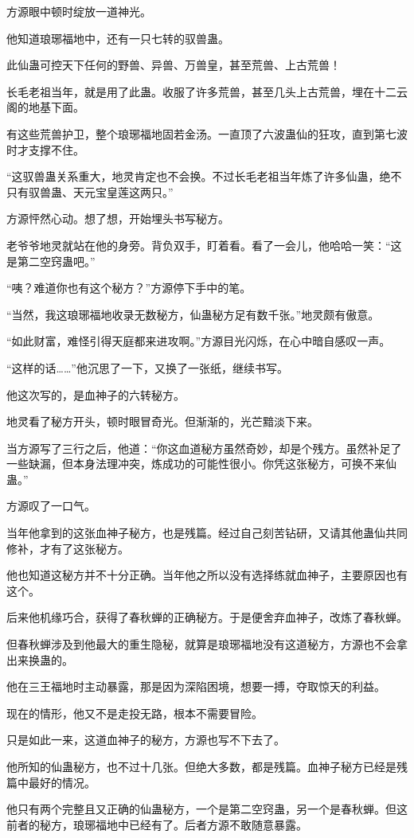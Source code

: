 \begin{this_body}
方源眼中顿时绽放一道神光。

他知道琅琊福地中，还有一只七转的驭兽蛊。

此仙蛊可控天下任何的野兽、异兽、万兽皇，甚至荒兽、上古荒兽！

长毛老祖当年，就是用了此蛊。收服了许多荒兽，甚至几头上古荒兽，埋在十二云阁的地基下面。

有这些荒兽护卫，整个琅琊福地固若金汤。一直顶了六波蛊仙的狂攻，直到第七波时才支撑不住。

“这驭兽蛊关系重大，地灵肯定也不会换。不过长毛老祖当年炼了许多仙蛊，绝不只有驭兽蛊、天元宝皇莲这两只。”

方源怦然心动。想了想，开始埋头书写秘方。

老爷爷地灵就站在他的身旁。背负双手，盯着看。看了一会儿，他哈哈一笑：“这是第二空窍蛊吧。”

“咦？难道你也有这个秘方？”方源停下手中的笔。

“当然，我这琅琊福地收录无数秘方，仙蛊秘方足有数千张。”地灵颇有傲意。

“如此财富，难怪引得天庭都来进攻啊。”方源目光闪烁，在心中暗自感叹一声。

“这样的话……”他沉思了一下，又换了一张纸，继续书写。

他这次写的，是血神子的六转秘方。

地灵看了秘方开头，顿时眼冒奇光。但渐渐的，光芒黯淡下来。

当方源写了三行之后，他道：“你这血道秘方虽然奇妙，却是个残方。虽然补足了一些缺漏，但本身法理冲突，炼成功的可能性很小。你凭这张秘方，可换不来仙蛊。”

方源叹了一口气。

当年他拿到的这张血神子秘方，也是残篇。经过自己刻苦钻研，又请其他蛊仙共同修补，才有了这张秘方。

他也知道这秘方并不十分正确。当年他之所以没有选择练就血神子，主要原因也有这个。

后来他机缘巧合，获得了春秋蝉的正确秘方。于是便舍弃血神子，改炼了春秋蝉。

但春秋蝉涉及到他最大的重生隐秘，就算是琅琊福地没有这道秘方，方源也不会拿出来换蛊的。

他在三王福地时主动暴露，那是因为深陷困境，想要一搏，夺取惊天的利益。

现在的情形，他又不是走投无路，根本不需要冒险。

只是如此一来，这道血神子的秘方，方源也写不下去了。

他所知的仙蛊秘方，也不过十几张。但绝大多数，都是残篇。血神子秘方已经是残篇中最好的情况。

他只有两个完整且又正确的仙蛊秘方，一个是第二空窍蛊，另一个是春秋蝉。但这前者的秘方，琅琊福地中已经有了。后者方源不敢随意暴露。


\end{this_body}
